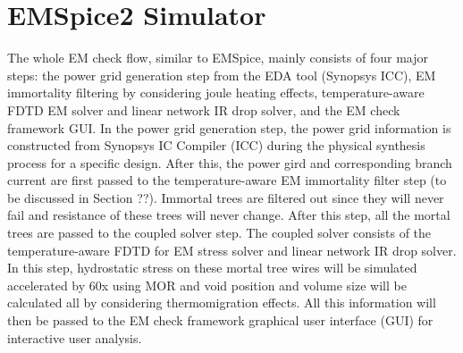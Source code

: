 \section{EMSpice2 Simulator}
  \label{sec:emspice}
The whole EM check flow, similar to EMSpice, mainly consists of four major
steps: the power grid generation step from the EDA tool
(Synopsys ICC), EM immortality filtering by considering joule heating effects, temperature-aware
FDTD EM solver and linear network IR drop solver, and the EM check
framework GUI. In the power grid generation step, the power
grid information is constructed from Synopsys IC Compiler
(ICC) during the physical synthesis process for a specific
design. After this, the power gird and corresponding
branch current are first passed to the temperature-aware EM immortality
filter step (to be discussed in Section ??). Immortal trees are
filtered out since they will never fail and resistance of these
trees will never change. After this step, all the mortal trees
are passed to the coupled solver step. The coupled solver consists
of the temperature-aware FDTD for EM stress solver and linear network
IR drop solver. In this step, hydrostatic stress on these mortal tree wires will
be simulated accelerated by 60x using MOR and void position and volume size will be calculated all by considering thermomigration effects.
All this information will then be passed to the EM check
framework graphical user interface (GUI) for interactive user
analysis.
